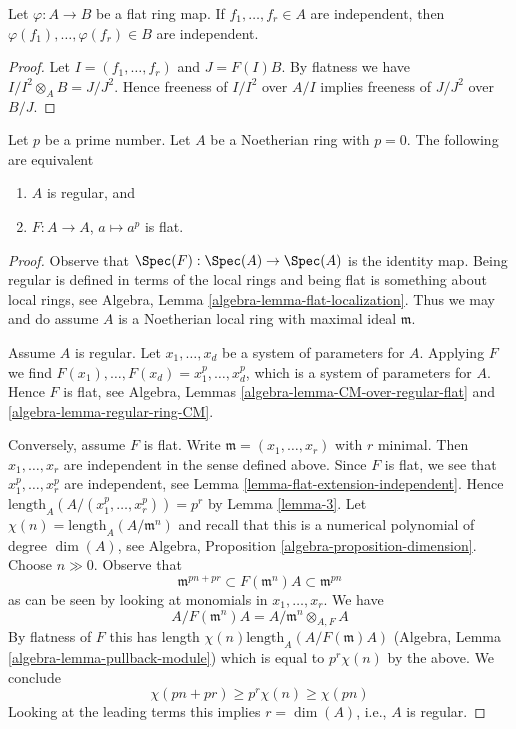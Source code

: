 \begin{lemma}
\label{lemma-flat-extension-independent}
Let $\varphi : A \to B$ be a flat ring map.
If $f_1, \ldots, f_r \in A$ are independent, then
$\varphi(f_1), \ldots, \varphi(f_r) \in B$ are independent.
\end{lemma}

\begin{proof}
Let $I = (f_1, \ldots, f_r)$ and $J = F(I)B$. By flatness we have
$I/I^2 \otimes_A B = J/J^2$. Hence freeness of $I/I^2$ over $A/I$
implies freeness of $J/J^2$ over $B/J$.
\end{proof}

\begin{lemma}[Kunz]
\label{lemma-frobenius-flat-regular}
\begin{reference}
\cite{Kunz-flat}
\end{reference}
Let $p$ be a prime number.
Let $A$ be a Noetherian ring with $p = 0$.
The following are equivalent
\begin{enumerate}
\item $A$ is regular, and
\item $F : A \to A$, $a \mapsto a^p$ is flat.
\end{enumerate}
\end{lemma}

\begin{proof}
Observe that $\Spec(F) : \Spec(A) \to \Spec(A)$ is the identity map.
Being regular is defined in terms of the local rings and being flat
is something about local rings, see
Algebra, Lemma \ref{algebra-lemma-flat-localization}.
Thus we may and do assume $A$ is a Noetherian
local ring with maximal ideal $\mathfrak m$.

\medskip\noindent
Assume $A$ is regular. Let $x_1, \ldots, x_d$ be a
system of parameters for $A$. Applying $F$ we find
$F(x_1), \ldots, F(x_d) = x_1^p, \ldots, x_d^p$,
which is a system of parameters for $A$. Hence $F$ is flat, see
Algebra, Lemmas \ref{algebra-lemma-CM-over-regular-flat} and
\ref{algebra-lemma-regular-ring-CM}.

\medskip\noindent
Conversely, assume $F$ is flat. Write $\mathfrak m = (x_1, \ldots, x_r)$
with $r$ minimal. Then $x_1, \ldots, x_r$ are independent in the sense
defined above. Since $F$ is flat, we see that $x_1^p, \ldots, x_r^p$
are independent, see Lemma \ref{lemma-flat-extension-independent}.
Hence $\text{length}_A(A/(x_1^p, \ldots, x_r^p)) = p^r$ by
Lemma \ref{lemma-3}.
Let $\chi(n) = \text{length}_A(A/\mathfrak m^n)$ and recall
that this is a numerical polynomial of degree $\dim(A)$, see
Algebra, Proposition \ref{algebra-proposition-dimension}.
Choose $n \gg 0$. Observe that
$$
\mathfrak m^{pn + pr} \subset F(\mathfrak m^n)A \subset \mathfrak m^{pn}
$$
as can be seen by looking at monomials in $x_1, \ldots, x_r$. We have
$$
A/F(\mathfrak m^n)A = A/\mathfrak m^n \otimes_{A, F} A
$$
By flatness of $F$ this has length $\chi(n) \text{length}_A(A/F(\mathfrak m)A)$
(Algebra, Lemma \ref{algebra-lemma-pullback-module})
which is equal to $p^r\chi(n)$ by the above. We conclude
$$
\chi(pn + pr) \geq p^r\chi(n) \geq \chi(pn)
$$
Looking at the leading terms this implies $r = \dim(A)$, i.e., $A$ is regular.
\end{proof}




